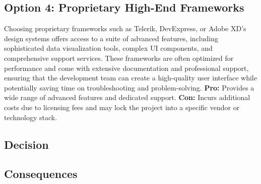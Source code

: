 \subsection*{Option 4: Proprietary High-End Frameworks}
Choosing proprietary frameworks such as Telerik, DevExpress, or Adobe XD’s design systems offers access to a suite of advanced features, including sophisticated data visualization tools, complex UI components, and comprehensive support services. These frameworks are often optimized for performance and come with extensive documentation and professional support, ensuring that the development team can create a high-quality user interface while potentially saving time on troubleshooting and problem-solving.
\textbf{Pro:} Provides a wide range of advanced features and dedicated support.
\textbf{Con:} Incurs additional costs due to licensing fees and may lock the project into a specific vendor or technology stack.

\subsection*{Decision}

\subsection*{Consequences}

